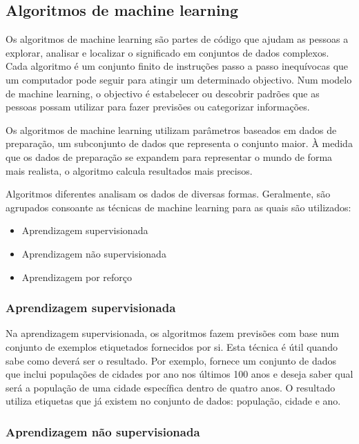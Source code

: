 \documentclass[a4paper,10pt]{article}
\begin{document}
\subsection{Algoritmos de machine learning}

Os algoritmos de machine learning são partes de código que ajudam as pessoas a explorar, analisar e localizar o significado em conjuntos de dados complexos.
Cada algoritmo é um conjunto finito de instruções passo a passo inequívocas que um computador pode seguir para atingir um determinado objectivo.
Num modelo de machine learning, o objectivo é estabelecer ou descobrir padrões que as pessoas possam utilizar para fazer previsões ou categorizar informações.

Os algoritmos de machine learning utilizam parâmetros baseados em dados de preparação, um subconjunto de dados que representa o conjunto maior.
À medida que os dados de preparação se expandem para representar o mundo de forma mais realista, o algoritmo calcula resultados mais precisos.

Algoritmos diferentes analisam os dados de diversas formas.
Geralmente, são agrupados consoante as técnicas de machine learning para as quais são utilizados:
\begin{itemize}
    \item Aprendizagem supervisionada
    \item Aprendizagem não supervisionada
    \item Aprendizagem por reforço
\end{itemize}

\subsubsection{Aprendizagem supervisionada}

Na aprendizagem supervisionada, os algoritmos fazem previsões com base num conjunto de exemplos etiquetados fornecidos por si.
Esta técnica é útil quando sabe como deverá ser o resultado.
Por exemplo, fornece um conjunto de dados que inclui populações de cidades por ano nos últimos 100 anos e deseja saber qual será a população de uma cidade específica dentro de quatro anos.
O resultado utiliza etiquetas que já existem no conjunto de dados: população, cidade e ano.

\subsubsection{Aprendizagem não supervisionada}
\end{document}
